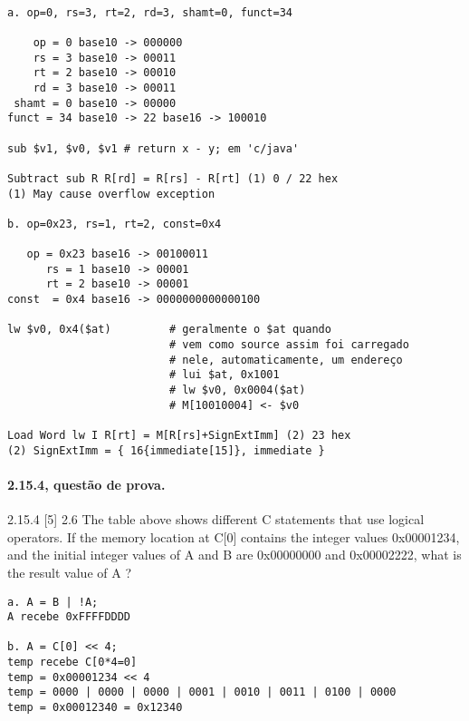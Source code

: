 \documentclass{article}
\begin{document}
\begin{verbatim}

a. op=0, rs=3, rt=2, rd=3, shamt=0, funct=34

    op = 0 base10 -> 000000
    rs = 3 base10 -> 00011
    rt = 2 base10 -> 00010
    rd = 3 base10 -> 00011
 shamt = 0 base10 -> 00000
funct = 34 base10 -> 22 base16 -> 100010

sub $v1, $v0, $v1 # return x - y; em 'c/java'

Subtract sub R R[rd] = R[rs] - R[rt] (1) 0 / 22 hex
(1) May cause overflow exception

b. op=0x23, rs=1, rt=2, const=0x4

   op = 0x23 base16 -> 00100011
      rs = 1 base10 -> 00001
      rt = 2 base10 -> 00001
const  = 0x4 base16 -> 0000000000000100

lw $v0, 0x4($at)         # geralmente o $at quando
                         # vem como source assim foi carregado
                         # nele, automaticamente, um endereço
                         # lui $at, 0x1001
                         # lw $v0, 0x0004($at)
                         # M[10010004] <- $v0

Load Word lw I R[rt] = M[R[rs]+SignExtImm] (2) 23 hex
(2) SignExtImm = { 16{immediate[15]}, immediate }

\end{verbatim}

\paragraph{2.15.4, questão de prova.}

2.15.4 [5] 2.6 The table above shows different C statements that use logical
operators. If the memory location at C[0] contains the integer values
0x00001234, and the initial integer values of A and B are 0x00000000 and
0x00002222, what is the result value of A ?

\begin{verbatim}
a. A = B | !A;
A recebe 0xFFFFDDDD

b. A = C[0] << 4;
temp recebe C[0*4=0]
temp = 0x00001234 << 4
temp = 0000 | 0000 | 0000 | 0001 | 0010 | 0011 | 0100 | 0000
temp = 0x00012340 = 0x12340
\end{verbatim}
\end{document}
